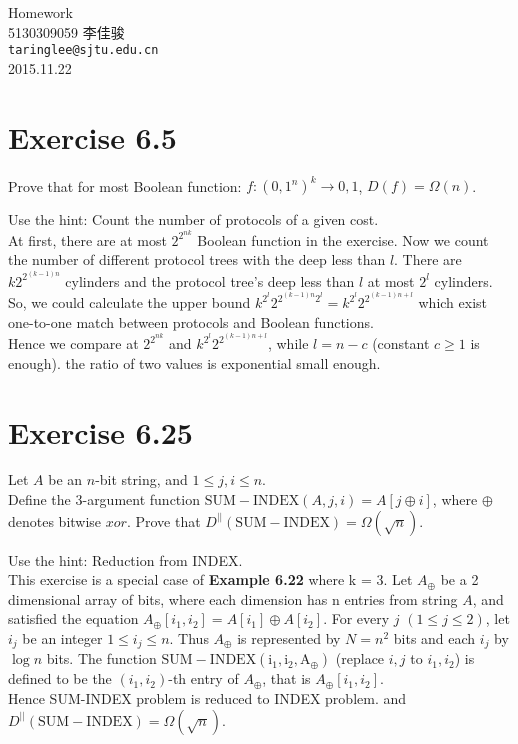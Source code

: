 \documentclass[11pt, fleqn, a4paper]{report}
\begin{document}
\begin{titlepage}
\vspace*{40mm}
\begin{center}
{\Huge Homework }\\[30mm]

{\Large 5130309059 \quad \quad 李佳骏}\\[3mm]
\texttt{taringlee@sjtu.edu.cn}\\[10mm]

2015.11.22

\end{center}
\end{titlepage}

\section*{Exercise 6.5}
Prove that for most Boolean function: $f : ({0,1}^n)^k \rightarrow {0,1}$, $D(f) = \Omega(n)$.

Use the hint: Count the number of protocols of a given cost.\\
At first, there are at most $2^{2^{nk}}$ Boolean function in the exercise. Now we count the number of different protocol trees with the deep less than $l$. There are $k2^{2^{(k-1)n}}$ cylinders and  the protocol tree's deep less than $l$ at most $2^l$ cylinders. So, we could calculate the upper bound $k^{2^l}2^{2^{(k-1)n}2^l} = k^{2^l}2^{2^{(k-1)n+l}}$ which exist one-to-one match between protocols and Boolean functions.\\
Hence we compare at $2^{2^{nk}}$ and $ k^{2^l}2^{2^{(k-1)n+l}}$, while $l = n - c$ (constant $c \geq 1$ is enough). the ratio of two values is exponential small enough.

\section*{Exercise 6.25}
Let $A$ be an $n$-bit string, and $1 \leq j,i \leq n$. \\
Define the 3-argument function $\mathrm{SUM-INDEX} (A,j,i) = A[j \oplus i]$, where $\oplus$ denotes bitwise $xor$. Prove that $D^{||}(\mathrm{SUM-INDEX})=\Omega(\sqrt{n})$.

Use the hint: Reduction from INDEX.\\
This exercise is a special case of \textbf{Example 6.22} where k = 3. Let $A_{\oplus}$ be a 2 dimensional array of bits, where each dimension has n entries from string $A$, and satisfied the equation $A_{\oplus}[i_1,i_2] = A[i_1] \oplus A[i_2]$. For every $j$ $(1 \leq j \leq 2)$, let $i_j$ be an integer $1 \leq i_j \leq n$. Thus $A_{\oplus}$ is represented by $N = n^2$ bits and each $i_j$ by $\log{n}$ bits. The function $\mathrm{SUM-INDEX(i_1,i_2,A_{\oplus})}$ (replace $i,j$ to $i_1,i_2$) is defined to be the $(i_1,i_2)$-th entry of $A_{\oplus}$, that is $A_{\oplus}[i_1,i_2]$.\\
Hence SUM-INDEX problem is reduced to INDEX problem. and $D^{||}(\mathrm{SUM-INDEX})=\Omega(\sqrt{n})$.
\end{document}
